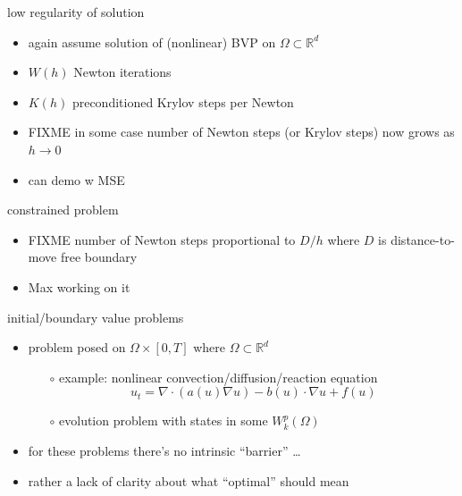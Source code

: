 \documentclass[hide notes,intlimits,usenames,dvipsnames]{beamer}
\newcommand{\RR}{\mathbb{R}}
\newcommand{\Div}{\nabla\cdot}
\newcommand{\grad}{\nabla}
\begin{document}
\begin{frame}{low regularity of solution}
\begin{itemize}
\item again assume solution of (nonlinear) BVP on $\Omega \subset \RR^d$
\item $W(h)$ Newton iterations
\item $K(h)$ preconditioned Krylov steps per Newton
\item FIXME  in some case number of Newton steps (or Krylov steps) now grows as $h\to 0$
\item can demo w MSE
\end{itemize}
\end{frame}


\begin{frame}{constrained problem}
\begin{itemize}
\item FIXME  number of Newton steps proportional to $D/h$ where $D$ is distance-to-move free boundary
\item Max working on it
\end{itemize}
\end{frame}


\begin{frame}{initial/boundary value problems}

\begin{itemize}
\item problem posed on $\Omega \times [0,T]$ where $\Omega \subset \RR^d$
    \begin{itemize}
    \item[$\circ$] example: nonlinear convection/diffusion/reaction equation
      $$u_t = \Div(a(u) \grad u) - b(u)\cdot \grad u + f(u)$$
    \item[$\circ$] evolution problem with states in some $W_k^p(\Omega)$
    \end{itemize}
\item for these problems there's no intrinsic ``barrier'' \dots
\item rather a lack of clarity about what ``optimal'' should mean
\end{itemize}
\end{frame}
\end{document}
